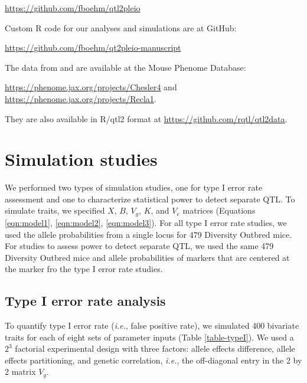 \documentclass[12pt,twoside, lineno]{gsajnl}
\begin{document}
\href{https://github.com/fboehm/qtl2pleio}{https://github.com/fboehm/qtl2pleio}

\noindent Custom R code for our analyses and simulations are at GitHub:

\href{https://github.com/fboehm/qtl2pleio-manuscript}{https://github.com/fboehm/qt2pleio-manuscript}

\noindent The data from \citet{recla2014precise} and
\citet{logan2013high} are available at the Mouse Phenome Database:

\href{https://phenome.jax.org/projects/Chesler4}{https://phenome.jax.org/projects/Chesler4} and \href{https://phenome.jax.org/projects/Recla1}{https://phenome.jax.org/projects/Recla1}.

\noindent They are also available in R/qtl2 format at
\href{https://github.com/rqtl/qtl2data}{https://github.com/rqtl/qtl2data}.




\section{Simulation studies}

We performed two types of simulation studies, one for type I error
rate assessment and one to characterize statistical power to detect
separate QTL. To simulate traits, we specified $X$, $B$, $V_g$, $K$,
and $V_e$ matrices (Equations \ref{eqn:model1}, \ref{eqn:model2},
\ref{eqn:model3}). For all type I error rate studies, we used the
allele probabilities from a single locus for 479 Diversity Outbred
mice. For studies to assess power to detect separate QTL, we used the
same 479 Diversity Outbred mice and allele probabilities of markers
that are centered at the marker fro the type I error rate studies.

\subsection{Type I error rate analysis}

To quantify type I error rate ({\em i.e.}, false positive rate), we
simulated 400 bivariate traits for each of eight sets of parameter
inputs (Table \ref{table-typeI}). We used a $2^3$ factorial
experimental design with three factors: allele effects difference,
allele effects partitioning, and genetic correlation, \textit{i.e.},
the off-diagonal entry in the 2 by 2 matrix $V_g$.
\end{document}
